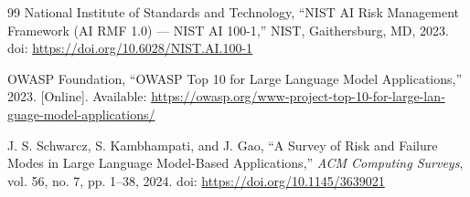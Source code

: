 \begin{thebibliography}{99}
\textenglish{National Institute of Standards and Technology, ``NIST AI Risk Management Framework (AI RMF 1.0) — NIST AI 100-1,'' NIST, Gaithersburg, MD, 2023. doi: \url{https://doi.org/10.6028/NIST.AI.100-1}}

\textenglish{OWASP Foundation, ``OWASP Top 10 for Large Language Model Applications,'' 2023. [Online]. Available: \url{https://owasp.org/www-project-top-10-for-large-language-model-applications/}}

\textenglish{J. S. Schwarcz, S. Kambhampati, and J. Gao, ``A Survey of Risk and Failure Modes in Large Language Model-Based Applications,'' \textit{ACM Computing Surveys}, vol. 56, no. 7, pp. 1--38, 2024. doi: \url{https://doi.org/10.1145/3639021}}

\end{thebibliography}
